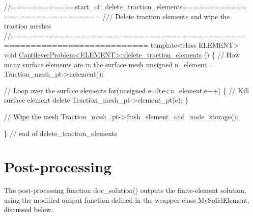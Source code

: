  
\begin{DoxyCodeInclude}
\textcolor{comment}{//============start\_of\_delete\_traction\_elements==============================}
\textcolor{comment}{/// Delete traction elements and wipe the  traction meshes}
\textcolor{comment}{}\textcolor{comment}{//=======================================================================}
\textcolor{keyword}{template}<\textcolor{keyword}{class} ELEMENT>
\textcolor{keywordtype}{void} \hyperlink{classCantileverProblem_aeb64122ce3783bf36df3696c41e5d2a5}{CantileverProblem<ELEMENT>::delete\_traction\_elements}
      ()
\{
 \textcolor{comment}{// How many surface elements are in the surface mesh}
 \textcolor{keywordtype}{unsigned} n\_element = Traction\_mesh\_pt->nelement();
 
 \textcolor{comment}{// Loop over the surface elements}
 \textcolor{keywordflow}{for}(\textcolor{keywordtype}{unsigned} e=0;e<n\_element;e++)
  \{
   \textcolor{comment}{// Kill surface element}
   \textcolor{keyword}{delete} Traction\_mesh\_pt->element\_pt(e);
  \}
 
 \textcolor{comment}{// Wipe the mesh}
 Traction\_mesh\_pt->flush\_element\_and\_node\_storage();

\} \textcolor{comment}{// end of delete\_traction\_elements}

\end{DoxyCodeInclude}




 

\hypertarget{index_doc}{}\section{Post-\/processing}\label{index_doc}
The post-\/processing function {\ttfamily doc\+\_\+solution()} outputs the finite-\/element solution, using the modified output function defined in the wrapper class {\ttfamily My\+Solid\+Element}, discussed below.

 


